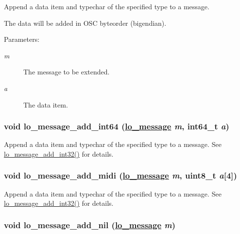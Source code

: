 Append a data item and typechar of the specified type to a message. 

The data will be added in OSC byteorder (bigendian).

\begin{Desc}
\item[Parameters:]
\begin{description}
\item[{\em m}]The message to be extended. \item[{\em a}]The data item. \end{description}
\end{Desc}
\hypertarget{group__liblolowlevel_gcc804708784d2ab1397c65bf99403864}{
\subsubsection[lo\_\-message\_\-add\_\-int64]{\setlength{\rightskip}{0pt plus 5cm}void lo\_\-message\_\-add\_\-int64 (\hyperlink{lo__types_8h_d126083c98d941f00eb72d1690b38d63}{lo\_\-message} {\em m}, int64\_\-t {\em a})}}
\label{group__liblolowlevel_gcc804708784d2ab1397c65bf99403864}


Append a data item and typechar of the specified type to a message. See \hyperlink{group__liblolowlevel_g31ac1e4c0ec6c61f665ce3f9bbdc53c3}{lo\_\-message\_\-add\_\-int32()} for details. 

\hypertarget{group__liblolowlevel_g4cd51119cad150e868987ba150a6b14b}{
\subsubsection[lo\_\-message\_\-add\_\-midi]{\setlength{\rightskip}{0pt plus 5cm}void lo\_\-message\_\-add\_\-midi (\hyperlink{lo__types_8h_d126083c98d941f00eb72d1690b38d63}{lo\_\-message} {\em m}, uint8\_\-t {\em a}\mbox{[}4\mbox{]})}}
\label{group__liblolowlevel_g4cd51119cad150e868987ba150a6b14b}


Append a data item and typechar of the specified type to a message. See \hyperlink{group__liblolowlevel_g31ac1e4c0ec6c61f665ce3f9bbdc53c3}{lo\_\-message\_\-add\_\-int32()} for details. 

\hypertarget{group__liblolowlevel_gc5061d92c52c03b9d23eff012cc1b496}{
\subsubsection[lo\_\-message\_\-add\_\-nil]{\setlength{\rightskip}{0pt plus 5cm}void lo\_\-message\_\-add\_\-nil (\hyperlink{lo__types_8h_d126083c98d941f00eb72d1690b38d63}{lo\_\-message} {\em m})}}
\label{group__liblolowlevel_gc5061d92c52c03b9d23eff012cc1b496}


